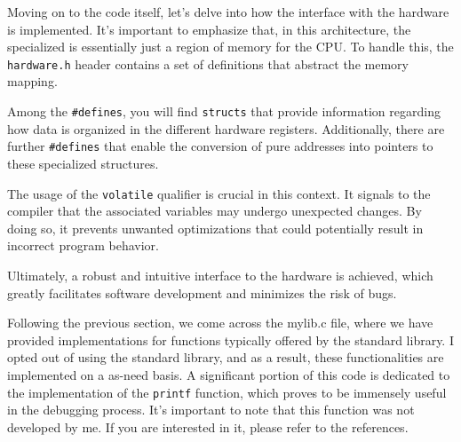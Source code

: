 \documentclass[12pt,a4paper]{article}
\begin{document}
Moving on to the code itself, let's delve into how the interface with the
hardware is implemented. It's important to emphasize that, in this
architecture, the specialized is essentially just a region of memory for the
CPU. To handle this, the \texttt{hardware.h} header contains a set of 
definitions that abstract the memory mapping.

Among the \texttt{\#defines}, you will find \texttt{structs} that provide
information regarding how data is organized in the different hardware registers.
Additionally, there are further \texttt{\#defines} that enable the conversion
of pure addresses into pointers to these specialized
structures.

The usage of the \texttt{volatile} qualifier is crucial in this context. It
signals to the compiler that the associated variables may undergo unexpected
changes. By doing so, it prevents unwanted optimizations that could potentially
result in incorrect program behavior.

Ultimately, a robust and intuitive interface to the hardware is achieved,
which greatly facilitates software development and minimizes the risk of bugs.

Following the previous section, we come across the mylib.c file, where we have
provided implementations for functions typically offered by the standard
library. I opted out of using the standard library, and as a result, these
functionalities are implemented on a as-need basis. A significant portion of
this code is dedicated to the implementation of the \texttt{printf} function,
which proves to be immensely useful in the debugging process. It's important
to note that this function was not developed by me. If you are interested in it,
please refer to the references.
\end{document}
